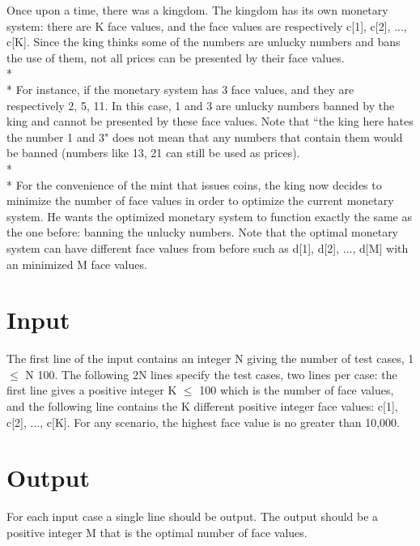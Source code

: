 
Once upon a time, there was a kingdom. The kingdom has its own monetary system: there are K face values, and the face values are respectively c[1], c[2], ..., c[K]. Since the king thinks some of the numbers are unlucky numbers and bans the use of them, not all prices can be presented by their face values. 
\\*\\*
For instance, if the monetary system has 3 face values, and they are respectively 2, 5, 11. In this case, 1 and 3 are unlucky numbers banned by the king and cannot be presented by these face values. Note that ``the king here hates the number 1 and 3" does not mean that any numbers that contain them would be banned (numbers like 13, 21 can still be used as prices). 
\\*\\*
For the convenience of the mint that issues coins, the king now decides to minimize the number of face values in order to optimize the current monetary system. He wants the optimized monetary system to function exactly the same as the one before: banning the unlucky numbers. Note that the optimal monetary system can have different face values from before such as d[1], d[2], ..., d[M] with an minimized M face values.

\section*{Input}
The first line of the input contains an integer N giving the number of test cases, 1 $\leq$ N  100. The following 2N lines specify the test cases, two lines per case: the first line gives a positive integer K $\leq$ 100 which is the number of face values, and the following line contains the K different positive integer face values: c[1], c[2], ..., c[K]. For any scenario, the highest face value is no greater than 10,000.

\section*{Output}
For each input case a single line should be output. The output should be a positive integer M that is the optimal number of face values.